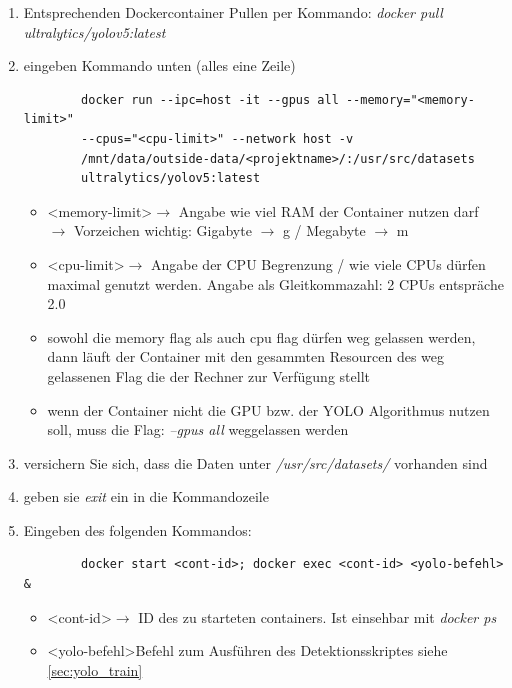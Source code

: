\begin{enumerate}
    \item Entsprechenden Dockercontainer Pullen per Kommando: \textit{docker pull ultralytics/yolov5:latest} 
    \item eingeben Kommando unten (alles eine Zeile)
    \begin{verbatim}
        docker run --ipc=host -it --gpus all --memory="<memory-limit>"
        --cpus="<cpu-limit>" --network host -v 
        /mnt/data/outside-data/<projektname>/:/usr/src/datasets
        ultralytics/yolov5:latest
    \end{verbatim}
    \begin{itemize}
        \item \textless memory-limit\textgreater $\rightarrow$ Angabe wie viel RAM der Container nutzen darf $\rightarrow$ Vorzeichen wichtig: Gigabyte  $\rightarrow$ g / Megabyte $\rightarrow$ m
        \item \textless cpu-limit\textgreater $\rightarrow$ Angabe der CPU Begrenzung / wie viele CPUs dürfen maximal genutzt werden. Angabe als Gleitkommazahl: 2 CPUs entspräche 2.0
        \item sowohl die memory flag als auch cpu flag dürfen weg gelassen werden, dann läuft der Container mit den gesammten Resourcen des weg gelassenen Flag die der Rechner zur Verfügung stellt
        \item wenn der Container nicht die GPU bzw. der YOLO Algorithmus nutzen soll, muss die Flag: \textit{--gpus all} weggelassen werden
    \end{itemize}
    \item versichern Sie sich, dass die Daten unter \textit{/usr/src/datasets/} vorhanden sind
    \item geben sie \textit{exit} ein in die Kommandozeile 
    \item Eingeben des folgenden Kommandos:
    \begin{verbatim}
        docker start <cont-id>; docker exec <cont-id> <yolo-befehl> &
    \end{verbatim}
    \begin{itemize}
        \item  \textless cont-id\textgreater $\rightarrow$ ID des zu starteten containers. Ist einsehbar mit \textit{docker ps}
        \item \textless yolo-befehl\textgreater  Befehl zum Ausführen des Detektionsskriptes siehe \autoref{sec:yolo_train}
    \end{itemize}
\end{enumerate}

